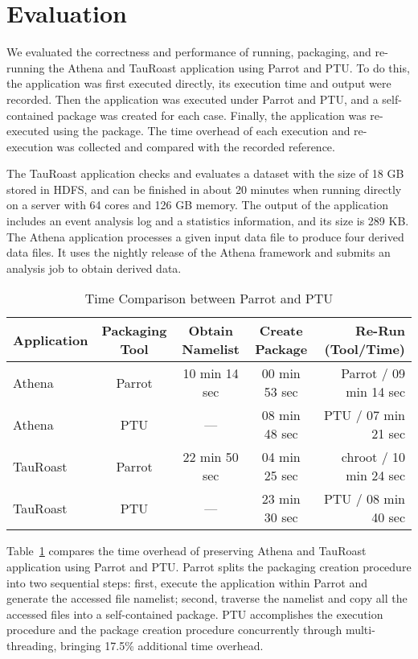 \section{Evaluation}

We evaluated the correctness and performance of running, packaging, and re-running the Athena and TauRoast application using Parrot and PTU.
To do this, the application was first executed directly, its execution time and output were recorded. Then the application was executed under Parrot and PTU, and a self-contained package was created for each case. Finally, the application was re-executed using the package. The time overhead of each execution and re-execution was collected and compared with the recorded reference.

The TauRoast application checks and evaluates a dataset with the size of 18 GB stored in HDFS, and can be finished in about 20 minutes when running directly on a server with 64 cores and 126 GB memory. The output of the application includes an event analysis log and a statistics information, and its size is 289 KB. The Athena application processes a given input data file to produce four derived data files. It uses the nightly release of the Athena framework and 
submits an analysis job to obtain derived data.  

\begin{table}
\small
    \centering
    \begin{tabular}{lcccr}
    \hline
    \bf Application & \bf Packaging Tool & \bf Obtain Namelist & \bf Create Package & \bf Re-Run (Tool/Time)\\ \hline
	Athena & Parrot & 10 min 14 sec & 00 min 53 sec & Parrot / 09 min 14 sec  \\ \hline
	Athena & PTU & --- & 08 min 48 sec & PTU / 07 min 21 sec  \\ \hline
	TauRoast & Parrot & 22 min 50 sec  & 04 min 25 sec &chroot / 10 min 24 sec \\ \hline
	TauRoast & PTU & --- & 23 min 30 sec & PTU / 08 min 40 sec \\ \hline 
    \end{tabular}
    \normalsize
    \caption{Time Comparison between Parrot and PTU}
    \label{table:parrot_ptu}
\end{table}    

Table~\ref{table:parrot_ptu} compares the time overhead of preserving Athena and TauRoast application using Parrot and PTU.
Parrot splits the packaging creation procedure into two sequential steps: first, execute the application within Parrot and generate the accessed file namelist; second, traverse the namelist and copy all the accessed files into a self-contained package.
PTU accomplishes the execution procedure and the package creation procedure concurrently through multi-threading, bringing 17.5\% additional time overhead.

